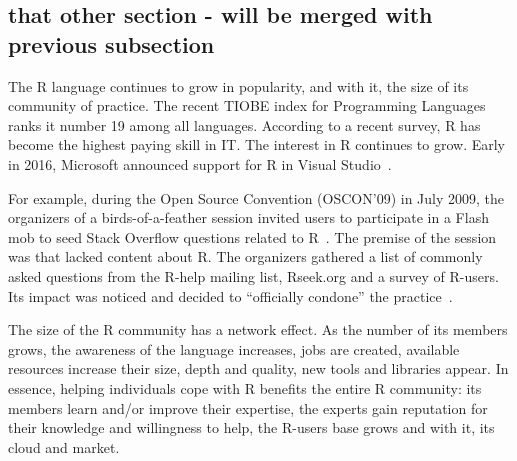 \subsection{that other section - will be merged with previous subsection}


The R language continues to grow in popularity, and with it, the size of its community of practice. The recent TIOBE index for Programming Languages ranks it
number 19 among all languages.  According to a recent survey, R has become the highest paying skill in IT. The interest in R continues to grow.
Early in 2016, Microsoft announced support for R in Visual Studio~\cite{RMicrosoft2016}.

For example, during the Open Source Convention (OSCON'09) in July 2009, the organizers of a birds-of-a-feather session invited users
to participate in a Flash mob to seed Stack Overflow questions related to R~\cite{OSCONRFlashMob2009}. The premise of the session was that \SO lacked 
content about R. The organizers gathered a list of commonly asked questions from the R-help mailing list, Rseek.org and a survey of R-users. Its impact was
noticed and \SO decided to ``officially condone'' the practice~\cite{SOFlashMob2009}.

The size of the R community has a network effect. As the number of its members grows, the awareness of the language increases, jobs are created, available resources increase their size, depth and quality, new tools and libraries appear. In essence, helping individuals cope with R benefits the entire R community: its members learn and/or improve their expertise, the experts gain reputation for their knowledge and willingness to help, the R-users base grows and with it, its cloud and market.


